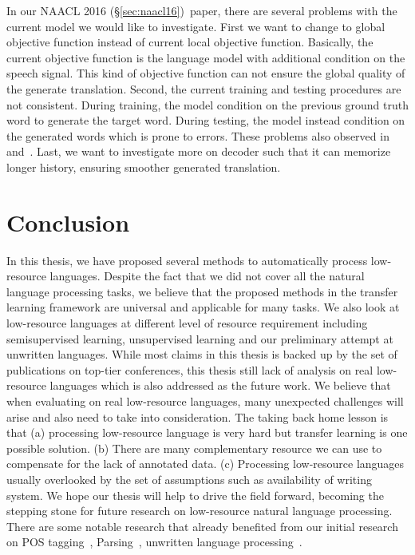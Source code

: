 \documentclass[12pt,twoside,final,hidelinks]{ltthesis}
\theoremstyle{definition}
\newcommand\naaclvi{NAACL 2016 (\S\ref{sec:naacl16})}
\begin{document}
In our \naaclvi\ paper, there are several problems with the current model we would like to investigate. First we want to change to global objective function 
instead of current local objective function. Basically, the current objective function is the language model with additional condition on the speech signal. 
This kind of objective function can not ensure the global quality of the generate translation. Second, the current training and testing procedures are not consistent. During training, the model condition on the previous ground truth word to generate the target word. During testing, the model instead condition 
on the generated words which is prone to errors. These problems also observed in~ and~. Last, we want to investigate more on decoder such that it can memorize longer history, ensuring smoother
generated translation. 

\section{Conclusion}
In this thesis, we have proposed several methods to automatically process low-resource languages. Despite the fact that we did not cover all the natural language 
processing tasks, we believe that the proposed methods in the transfer learning framework are universal and applicable for many tasks. We also look at low-resource
languages at different level of resource requirement including semisupervised learning, unsupervised learning and our preliminary attempt at unwritten languages. 
While most claims in this thesis is backed up by the set of publications on top-tier conferences, this thesis still lack of analysis on real low-resource 
languages which is also addressed as the future work. We believe that when evaluating on real low-resource languages, many unexpected challenges will arise and also 
need to take into consideration. 
The taking back home lesson is that (a) processing low-resource language is very hard but transfer learning is one possible solution. (b) There are many complementary resource we can use to compensate for the lack of annotated data. (c) Processing low-resource languages usually overlooked by the set of assumptions 
such as availability of writing system. 
We hope our thesis will help to drive the field forward, becoming the stepping stone for future research on low-resource natural language processing. There are some
notable research that already benefited from our initial research on POS tagging~\cite{DBLP:conf/conll/FangC16,Pecheux2016,zhang-EtAl:2016:N16-13,bacskaya2016semi}, Parsing~\cite{DBLP:journals/corr/GillickBVS15,Guo:2016:RLF:3016100.3016284,TACL892,DBLP:journals/corr/GuoCWL16,ledbetter-dickinson:2016:BEA11,TACL917}, unwritten language processing~\cite{DBLP:journals/corr/BansalKGL16,adams-EtAl:2016:EMNLP2016,anastasopoulos-chiang-duong:2016:EMNLP2016,Wilkinson+2016}. 
\end{document}
